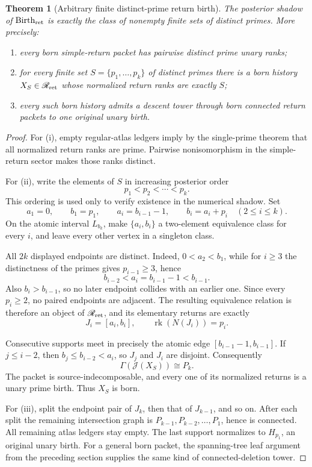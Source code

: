 \documentclass[11pt]{article}
\newtheorem{theorem}{Theorem}[section]
\newcommand{\rk}{\operatorname{rk}}
\newcommand{\Birth}{\operatorname{Birth}}
\begin{document}
\begin{theorem}[Arbitrary finite distinct-prime return birth]
\label{thm:return-combination}
The posterior shadow of \(\Birth_{\rm ret}\) is exactly the class of nonempty
finite sets of distinct primes.  More precisely:
\begin{enumerate}[label=(\roman*)]
\item every born simple-return packet has pairwise distinct prime unary ranks;
\item for every finite set \(S=\{p_1,\ldots,p_k\}\) of distinct primes there is
a born history \(X_S\in\mathscr R_{\rm ret}\) whose normalized return ranks are
exactly \(S\);
\item every such born history admits a descent tower through born connected
return packets to one original unary birth.
\end{enumerate}
\end{theorem}

\begin{proof}
For (i), empty regular-atlas ledgers imply by the single-prime theorem that all
normalized return ranks are prime.  Pairwise nonisomorphism in the simple-return
sector makes those ranks distinct.

For (ii), write the elements of \(S\) in increasing posterior order
\[
p_1<p_2<\cdots<p_k.
\]
This ordering is used only to verify existence in the numerical shadow.  Set
\[
a_1=0,
\qquad b_1=p_1,
\qquad
a_i=b_{i-1}-1,
\qquad
b_i=a_i+p_i
\quad(2\le i\le k).
\]
On the atomic interval \(L_{b_k}\), make \(\{a_i,b_i\}\) a two-element
equivalence class for every \(i\), and leave every other vertex in a singleton
class.

All \(2k\) displayed endpoints are distinct.  Indeed,
\(0<a_2<b_1\), while for \(i\ge3\) the distinctness of the primes gives
\(p_{i-1}\ge3\), hence
\[
b_{i-2}<a_i=b_{i-1}-1<b_{i-1}.
\]
Also \(b_i>b_{i-1}\), so no later endpoint collides with an earlier one.  Since
every \(p_i\ge2\), no paired endpoints are adjacent.  The resulting equivalence
relation is therefore an object of \(\mathscr R_{\rm ret}\), and its elementary
returns are exactly
\[
J_i=[a_i,b_i],
\qquad \rk(N(J_i))=p_i.
\]

Consecutive supports meet in precisely the atomic edge
\([b_{i-1}-1,b_{i-1}]\).  If \(j\le i-2\), then
\(b_j\le b_{i-2}<a_i\), so \(J_j\) and \(J_i\) are disjoint.  Consequently
\[
\Gamma(\mathcal J(X_S))\cong P_k.
\]
The packet is source-indecomposable, and every one of its normalized returns is
a unary prime birth.  Thus \(X_S\) is born.

For (iii), split the endpoint pair of \(J_k\), then that of \(J_{k-1}\), and so
on.  After each split the remaining intersection graph is
\(P_{k-1},P_{k-2},\ldots,P_1\), hence is connected.  All remaining atlas
ledgers stay empty.  The last support normalizes to \(H_{p_1}\), an original
unary birth.  For a general born packet, the spanning-tree leaf argument from
the preceding section supplies the same kind of connected-deletion tower.
\end{proof}
\end{document}
